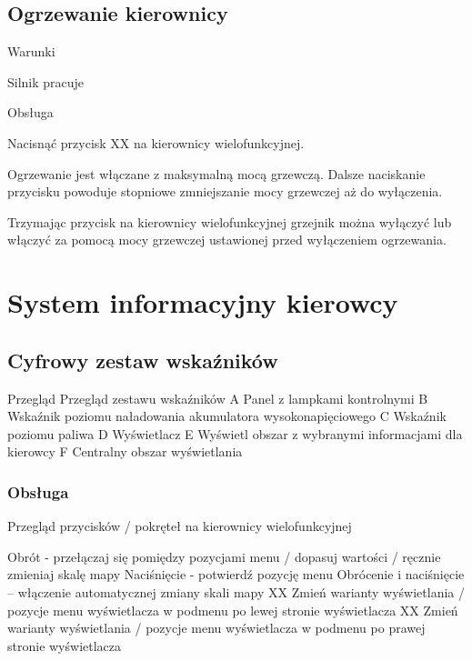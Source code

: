 \subsection{Ogrzewanie kierownicy}

Warunki
\begin{itemizeTick}
	\itemTick Silnik pracuje
\end{itemizeTick}

Obsługa
\begin{itemizeArrow}
	\itemArrow Nacisnąć przycisk XX na kierownicy wielofunkcyjnej.
\end{itemizeArrow}

Ogrzewanie jest włączane z maksymalną mocą grzewczą. Dalsze naciskanie przycisku powoduje stopniowe zmniejszanie mocy grzewczej aż do wyłączenia.

Trzymając przycisk na kierownicy wielofunkcyjnej grzejnik można wyłączyć lub włączyć za pomocą mocy grzewczej ustawionej przed wyłączeniem ogrzewania.

\section{System informacyjny kierowcy}

\subsection{Cyfrowy zestaw wskaźników}

Przegląd
Przegląd zestawu wskaźników
A Panel z lampkami kontrolnymi
B Wskaźnik poziomu naładowania akumulatora wysokonapięciowego  %
C Wskaźnik poziomu paliwa
D Wyświetlacz
E Wyświetl obszar z wybranymi informacjami dla kierowcy
F Centralny obszar wyświetlania

\subsubsection{Obsługa}

Przegląd przycisków / pokręteł na kierownicy wielofunkcyjnej

Obrót - przełączaj się pomiędzy pozycjami menu / dopasuj
wartości / ręcznie
zmieniaj skalę mapy
Naciśnięcie - potwierdź pozycję menu
Obrócenie i naciśnięcie – włączenie automatycznej zmiany skali mapy
XX Zmień warianty wyświetlania / pozycje menu wyświetlacza w podmenu po lewej stronie wyświetlacza
XX Zmień warianty wyświetlania / pozycje menu wyświetlacza w podmenu po prawej stronie wyświetlacza

